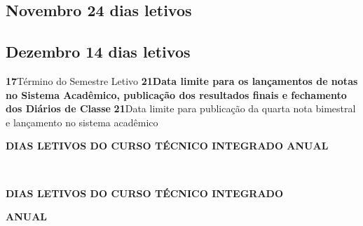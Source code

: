 \documentclass[thesis]{hmcposter}
\begin{document}
\begin{poster}
\subsection{Novembro \hfill 24 dias letivos} \null \newline \subsection{Dezembro \hfill 14 dias letivos}\textbf{17}\qquad Término do Semestre Letivo \newline \textbf{21}\qquad \textbf{Data limite para os lançamentos de notas no Sistema Acadêmico, publicação dos resultados finais e fechamento dos Diários de Classe} \newline \textbf{21}\qquad Data limite para publicação da quarta nota bimestral e lançamento no sistema acadêmico \newpage
~
\vfill
\begin{center}
\large \textbf{DIAS LETIVOS DO CURSO TÉCNICO INTEGRADO ANUAL}
\newline
\null
\newline
\begin{table}
\centering
{}
\end{table}
\newline
\null
\newline
\end{center}
\vfill
\null
\columnbreak
~
\vfill
\begin{center}
\large \textbf{DIAS LETIVOS DO CURSO TÉCNICO INTEGRADO}
\end{center}
\begin{center}
    \large \textbf{ANUAL}
\end{center}
\null
\begin{center}
\begin{table}
\centering
{}
\end{table}
\end{center}
\end{poster}
\end{document}
